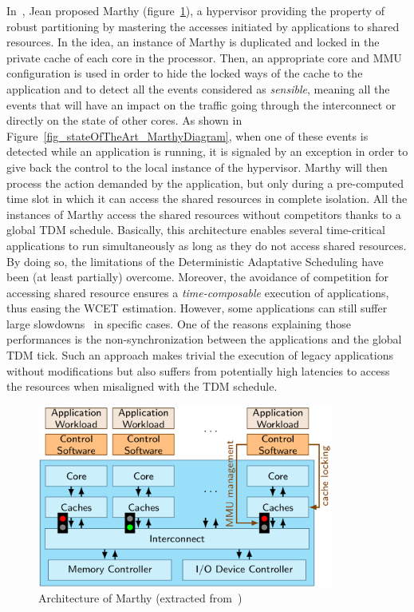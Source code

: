 \documentclass[main.tex]{subfiles}
\begin{document}
In~\cite{jean12}, Jean \etal proposed {\sc Marthy}
(figure~\ref{fig_stateOfTheArt_Marthy}), a hypervisor providing the property of
robust partitioning by mastering the accesses initiated by applications to
shared resources. In the idea, an instance of {\sc Marthy} is duplicated and
locked in the private cache of each core in the processor. Then, an appropriate
core and MMU configuration is used in order to hide the locked ways of the
cache to the application and to detect all the events considered as
\emph{sensible}, meaning all the events that will have an impact on the traffic
going through the interconnect or directly on the state of other cores. As
shown in Figure~\ref{fig_stateOfTheArt_MarthyDiagram}, when one of these events
is detected while an application is running, it is signaled by an exception in
order to give back the control to the local instance of the hypervisor. {\sc
Marthy} will then process the action demanded by the application, but only
during a pre-computed time slot in which it can access the shared resources in
complete isolation. All the instances of {\sc Marthy} access the shared
resources without competitors thanks to a global TDM schedule.  Basically, this
architecture enables several time-critical applications to run simultaneously
as long as they do not access shared resources. By doing so, the limitations of
the Deterministic Adaptative Scheduling have been (at least partially)
overcome. Moreover, the avoidance of competition for accessing shared resource
ensures a \emph{time-composable} execution of applications, thus easing the
WCET estimation. However, some applications can still suffer large
slowdowns~\cite{Jean2015} in specific cases. One of the reasons explaining
those performances is the non-synchronization between the applications and the
global TDM tick. Such an approach makes trivial the execution of legacy
applications without modifications but also suffers from potentially high
latencies to access the resources when misaligned with the TDM schedule. \\ 


\begin{figure}
    \centering
    \includegraphics[height=6cm]{imgs/png/stateOfTheArt_Marthy.png}
    \caption{Architecture of {\sc Marthy} (extracted from~\cite{jean12})}
    \label{fig_stateOfTheArt_Marthy}
\end{figure}
\end{document}
